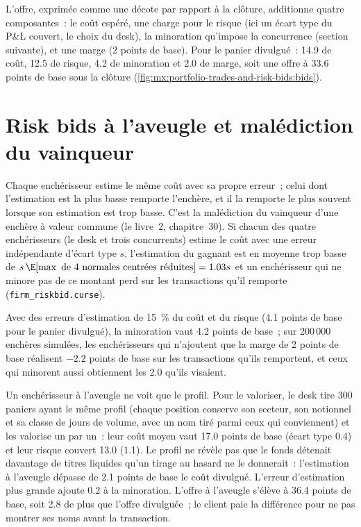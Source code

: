 L'offre, exprimée comme une décote par rapport à la clôture, additionne quatre composantes~: le coût espéré, une charge pour le risque (ici un écart type du P\&L couvert, le
choix du desk), la minoration qu'impose la concurrence (section suivante), et une marge (2 points de base). Pour le panier divulgué~: 14.9 de coût,
12.5 de risque, 4.2 de minoration et 2.0 de marge, soit une offre à 33.6 points de base sous la clôture (\cref{fig:mx:portfolio-trades-and-risk-bids:bids}).

\section{Risk bids à l'aveugle et malédiction du vainqueur}

Chaque enchérisseur estime le même coût avec sa propre erreur~; celui dont l'estimation est la plus basse remporte l'enchère, et il la remporte le plus souvent lorsque son estimation est trop basse.
C'est la malédiction du vainqueur d'une enchère à valeur commune (le livre~2, chapitre~30). Si chacun des quatre enchérisseurs (le desk et trois concurrents) estime
le coût avec une erreur indépendante d'écart type $s$, l'estimation du gagnant est en moyenne trop basse de $s\,\E[\max\text{ de 4 normales centrées réduites}]=1.03s$
et un enchérisseur qui ne minore pas de ce montant perd sur les transactions qu'il remporte (\texttt{firm\_riskbid.curse}).

\label{lst:mx:portfolio-trades-and-risk-bids:curse}

Avec des erreurs d'estimation de 15~\% du coût et du risque (4.1 points de base pour le panier divulgué), la minoration vaut 4.2 points de base~; sur 200\,000
enchères simulées, les enchérisseurs qui n'ajoutent que la marge de 2 points de base réalisent $-2.2$ points de base sur les transactions qu'ils remportent, et ceux qui minorent aussi
obtiennent les 2.0 qu'ils visaient.

Un enchérisseur à l'aveugle ne voit que le profil. Pour le valoriser, le desk tire 300 paniers ayant le même profil (chaque position conserve son secteur, son notionnel et
sa classe de jours de volume, avec un nom tiré parmi ceux qui conviennent) et les valorise un par un~: leur coût moyen vaut 17.0 points de base (écart type 0.4)
et leur risque couvert 13.0 (1.1). Le profil ne révèle pas que le fonds détenait davantage de titres liquides qu'un tirage au hasard ne le donnerait~: l'estimation à l'aveugle
dépasse de 2.1 points de base le coût divulgué. L'erreur d'estimation plus grande ajoute 0.2 à la minoration. L'offre à l'aveugle s'élève à 36.4 points de base, soit 2.8 de plus que
l'offre divulguée~; le client paie la différence pour ne pas montrer ses noms avant la transaction.

